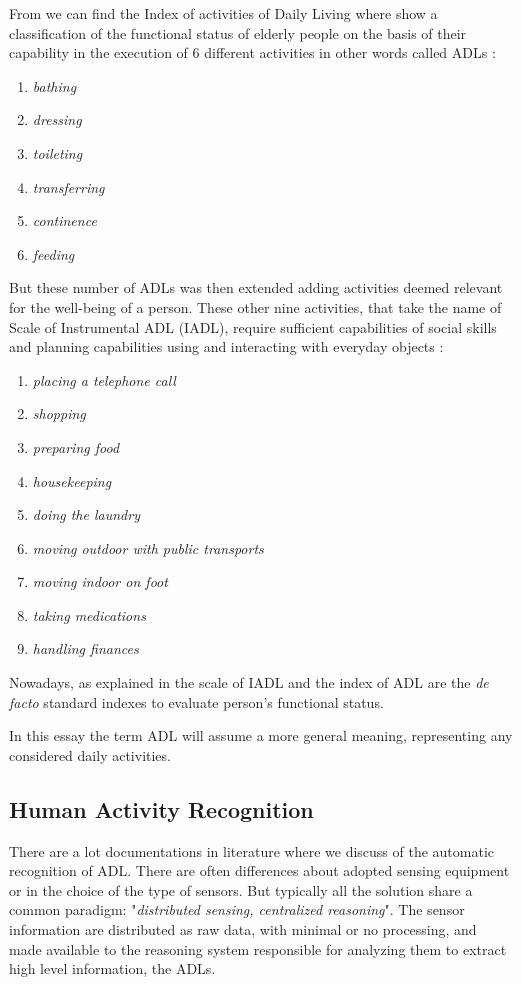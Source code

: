 \documentclass{thesisreport}
\begin{document}
From \cite{Multidisciplinary} we can find the Index of activities of Daily Living where show a classification of the functional status of elderly people on the basis of their capability in the execution of 6 different activities in other words called ADLs \cite{buoncompagni2017towards}:
\begin{enumerate}[noitemsep,topsep=1pt,parsep=1pt,partopsep=1pt]
    \item \textit{bathing}
    \item \textit{dressing}
    \item \textit{toileting}
    \item \textit{transferring}
    \item \textit{continence}
    \item \textit{feeding}
\end{enumerate}

But these number of ADLs was then extended adding activities deemed relevant for the well-being of a person. These other nine activities, that take the name of Scale of Instrumental ADL \cite{lawton1970assessment} (IADL), require sufficient capabilities of social skills and planning capabilities using and interacting with everyday objects \cite{buoncompagni2017towards}:
\begin{enumerate}[noitemsep,topsep=1pt,parsep=1pt,partopsep=1pt]
    \item \textit{placing a telephone call}
    \item \textit{shopping}
    \item \textit{preparing food}
    \item \textit{housekeeping}
    \item \textit{doing the laundry}
    \item \textit{moving outdoor with public transports}
    \item \textit{moving indoor on foot}
    \item \textit{taking medications}
    \item \textit{handling finances}
\end{enumerate}
Nowadays, as explained in \cite{bruno2014public} the scale of IADL and the index of ADL are the \textit{de facto} standard indexes to evaluate person’s functional status\cite{buoncompagni2017towards}. 

In this essay the term ADL will assume a more general meaning, representing any  considered daily activities. 

\subsection*{Human Activity Recognition}
There are a lot documentations in literature where we discuss of the automatic recognition of ADL. There are often differences about adopted sensing equipment or in the choice of the type of sensors. But typically all the solution share a common paradigm: "\textit{distributed sensing, centralized reasoning}". The sensor information are distributed as raw data, with minimal or no processing, and made available to the reasoning system responsible for analyzing them to extract high level information, the ADLs.   
\end{document}
